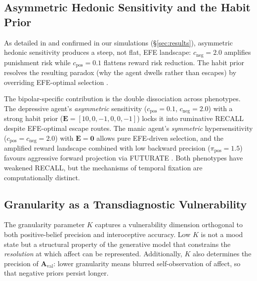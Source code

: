 \documentclass[11pt,a4paper]{article}
\begin{document}
\subsection{Asymmetric Hedonic Sensitivity and the Habit Prior}

As detailed in \citet{albarracin2026temporal} and confirmed in our simulations (\S\ref{sec:results}), asymmetric hedonic sensitivity produces a steep, not flat, EFE landscape: $c_{\text{neg}} = 2.0$ amplifies punishment risk while $c_{\text{pos}} = 0.1$ flattens reward risk reduction. The habit prior resolves the resulting paradox (why the agent dwells rather than escapes) by overriding EFE-optimal selection \citep{nolenhoeksema1991responses}.

The bipolar-specific contribution is the double dissociation across phenotypes. The depressive agent's \emph{asymmetric} sensitivity ($c_{\text{pos}} = 0.1$, $c_{\text{neg}} = 2.0$) with a strong habit prior ($\mathbf{E} = [10, 0, -1, 0, 0, -1]$) locks it into ruminative RECALL despite EFE-optimal escape routes. The manic agent's \emph{symmetric} hypersensitivity ($c_{\text{pos}} = c_{\text{neg}} = 2.0$) with $\mathbf{E} = \mathbf{0}$ allows pure EFE-driven selection, and the amplified reward landscape combined with low backward precision ($\pi_{\text{pos}} = 1.5$) favours aggressive forward projection via FUTURATE \citep{johnson2012behavioral}. Both phenotypes have weakened RECALL, but the mechanisms of temporal fixation are computationally distinct.

\subsection{Granularity as a Transdiagnostic Vulnerability}

The granularity parameter $K$ captures a vulnerability dimension orthogonal to both positive-belief precision and interoceptive accuracy. Low $K$ is not a mood state but a structural property of the generative model that constrains the \emph{resolution} at which affect can be represented. Additionally, $K$ also determines the precision of $\mathbf{A}_{\text{val}}$: lower granularity means blurred self-observation of affect, so that negative priors persist longer.
\end{document}
